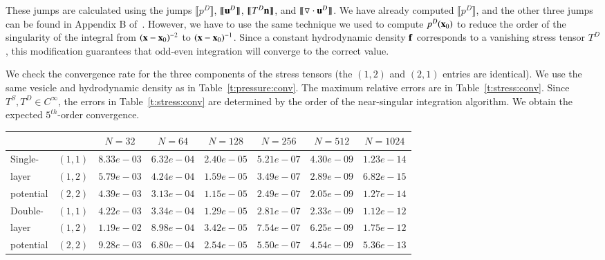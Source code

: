 These jumps are calculated using the jumps $\llbracket p^{D}
\rrbracket$, $\llbracket {\mathbf{u}}^{D} \rrbracket$, $\llbracket T^{D}{\mathbf{n}}
\rrbracket$, and $\llbracket {\triangledown} \cdot {\mathbf{u}}^{D} \rrbracket$.  We have
already computed $\llbracket p^{D} \rrbracket$, and the other three
jumps can be found in Appendix B of~\cite{ying-biros-zorin06}.
However, we have to use the same technique we used to compute
$p^{D}({\mathbf{x}}_{0})$ to reduce the order of the singularity of the integral
from $({\mathbf{x}}-{\mathbf{x}}_{0})^{-2}$ to $({\mathbf{x}}-{\mathbf{x}}_{0})^{-1}$.  Since a constant
hydrodynamic density ${\mathbf{f}}$ corresponds to a vanishing stress tensor
$T^{D}$, this modification guarantees that odd-even integration will
converge to the correct value.

We check the convergence rate for the three components of the stress
tensors (the $(1,2)$ and $(2,1)$ entries are identical).  We use the
same vesicle and hydrodynamic density as in
Table~\ref{t:pressure:conv}.  The maximum relative errors are in
Table~\ref{t:stress:conv}.  Since $T^{S},T^{D} \in C^{\infty}$, the
errors in Table~\ref{t:stress:conv} are determined by the order of the
near-singular integration algorithm.  We obtain the expected
$5^{th}$-order convergence.
\begin{table}[htp]
\begin{centering}
\begin{tabular}{lc|cccccc}
& & $N=32$ & $N=64$ & $N=128$ & $N=256$ & $N=512$ & $N=1024$ \\
\hline
Single- & $(1,1)$ & $8.33e-03$ & $6.32e-04$ & $2.40e-05$ & $5.21e-07$ & $4.30e-09$ & $1.23e-14$ \\ 
layer & $(1,2)$ & $5.79e-03$ & $4.24e-04$ & $1.59e-05$ & $3.49e-07$ & $2.89e-09$ & $6.82e-15$ \\ 
potential & $(2,2)$ & $4.39e-03$ & $3.13e-04$ & $1.15e-05$ & $2.49e-07$ & $2.05e-09$ & $1.27e-14$ \\ 
\hline
Double- & $(1,1)$ & $4.22e-03$ & $3.34e-04$ & $1.29e-05$ & $2.81e-07$ & $2.33e-09$ & $1.12e-12$ \\ 
layer & $(1,2)$ & $1.19e-02$ & $8.98e-04$ & $3.42e-05$ & $7.54e-07$ & $6.25e-09$ & $1.75e-12$ \\ 
potential & $(2,2)$ & $9.28e-03$ & $6.80e-04$ & $2.54e-05$ & $5.50e-07$ & $4.54e-09$ & $5.36e-13$ \\ 
\end{tabular}
\end{centering}
\end{table}




